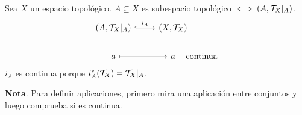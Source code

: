 \begin{ejer}
\begin{center}
\end{center}
\end{ejer}

\begin{ejer}
Sea $X$ un espacio topológico. $A \subseteq X$ es subespacio topológico $\iff (A, \mathcal{T}_X\vert{}_A)$.
$$\bt (A, \mc T_X\vert{}_A) \rar[hook]{i_A} & (X, \mc T_X) \\ a \rarmaps & a & [-12mm] \text{continua} \et$$
$i_A$ es continua porque $i_A^*(\mathcal{T}_X) = \mathcal{T}_X\vert{}_A$.
\end{ejer}
\noindent \textbf{Nota}.  Para definir aplicaciones, primero mira una aplicación entre conjuntos y luego comprueba si es continua.

